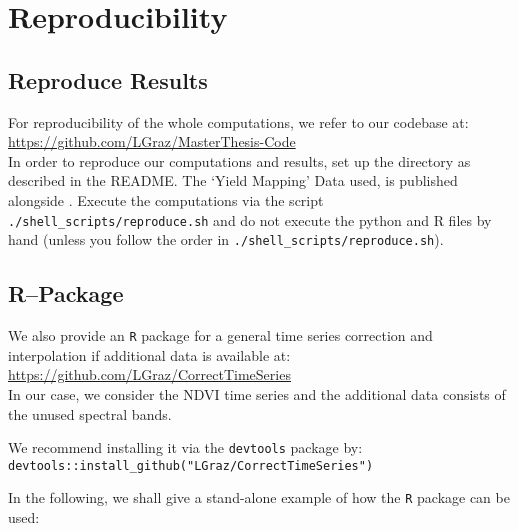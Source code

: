 \chapter{Reproducibility}\label{app:reproducibility}

\section{Reproduce Results}
For reproducibility of the whole computations, we refer to our codebase at:\\ \url{https://github.com/LGraz/MasterThesis-Code}\\ In order to reproduce our computations and results, set up the directory as described in the README. The `Yield Mapping' Data used, is published alongside \cite{perichPixelbasedCropYield2022}. Execute the computations via the script \texttt{./shell\_scripts/reproduce.sh} and do not execute the python and R files by hand (unless you follow the order in \texttt{./shell\_scripts/reproduce.sh}). 

\section{R--Package}
We also provide an \texttt{R} package for a general time series correction and interpolation if additional data is available at: \\
\url{https://github.com/LGraz/CorrectTimeSeries} \\
In our case, we consider the NDVI time series and the additional data consists of the unused spectral bands.

We recommend installing it via the \texttt{devtools} package by:\\
\texttt{devtools::install\_github("LGraz/CorrectTimeSeries")}

In the following, we shall give a stand-alone example of how the \texttt{R} package can be used:




